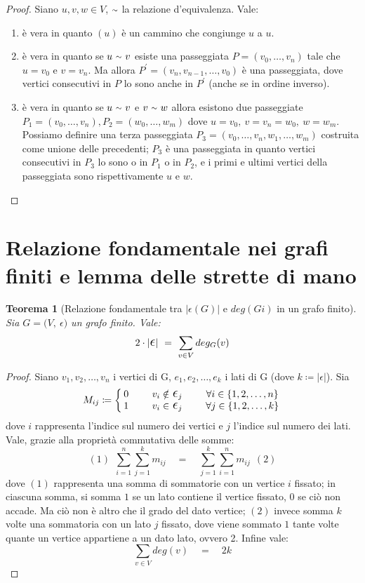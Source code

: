 \documentclass[12pt,twoside]{article}
\newcommand{\pr}{\prime}
\newcommand{\Eps}{${\Large$\epsilon$}$}
\newcommand{\grafo}{(V, \: \Eps)}
\newcommand{\til}{\raise.17ex\hbox{$\scriptstyle\mathtt{\sim}$}}
\newtheorem{theorem}{Teorema}
\begin{document}
\begin{proof}
Siano $u, v, w \in V$, $\til$ la relazione d'equivalenza. Vale:
\begin{enumerate}
\item è vera in quanto $(u)$ è un cammino che congiunge $u$ a $u$.
\item è vera in quanto se $u\ \til\ v$ esiste una passeggiata $P = (v_0,\ldots, v_n)$ tale che $u = v_0$ e $v = v_n$. Ma allora $P^{\pr} = (v_n, v_{n-1},\ldots ,v_0)$ è una passeggiata, dove vertici consecutivi in $P$ lo sono anche in $P^{\pr}$ (anche se in ordine inverso).
\item è vera in quanto se $u\ \til\ v$ e $v\ \til\ w$ allora esistono due passeggiate $P_1 = (v_0,\ldots ,v_n), P_2 = (w_0,\ldots, w_m)$ dove $u = v_0,\ v = v_n = w_0,\ w = w_m$. Possiamo definire una terza passeggiata $P_3 = (v_0,\ldots ,v_n,w_1,\ldots ,w_m)$ costruita come unione delle precedenti; $P_3$ è una passeggiata in quanto vertici consecutivi in $P_3$ lo sono o in $P_1$ o in $P_2$, e i primi e ultimi vertici della passeggiata sono rispettivamente $u$ e $w$.
\end{enumerate}
\end{proof}

\section{Relazione fondamentale nei grafi finiti e lemma delle strette di mano}
\begin{theorem}[Relazione fondamentale tra $|\Eps(G)|$ e $deg(Gi)$ in un grafo finito]
Sia $G = \grafo$ un grafo finito. Vale:
$$ 2 \cdot | \mathlarger{\mathlarger{\epsilon}} | \ = \ \sum_{v\in V} deg_G (v) $$
\end{theorem}

\begin{proof}
Siano $v_1, v_2,\ldots ,v_n$ i vertici di G, $e_1, e_2,\ldots, e_k$ i lati di G (dove $k \coloneqq | \Eps |$). Sia
\[
M_{ij} \coloneqq \left\{
\setlength\arraycolsep{2pt}
\begin{array}{ccc} 0 &\qquad v_i \notin \ \Eps_j &\qquad \forall i \in \{1, 2, \ldots , n\} \\ \relax
1 &\qquad v_i \in \ \Eps_j &\qquad \forall j \in \{1, 2, \ldots ,k \} 
\end{array}\right
.
\]
dove $i$ rappresenta l'indice sul numero dei vertici e $j$ l'indice sul numero dei lati. Vale, grazie alla proprietà commutativa delle somme:
$$ (1)\ \ \sum_{i=1}^n \sum_{j=1}^k m_{ij} \quad = \quad \sum_{j=1}^k\sum_{i=1}^n m_{ij}\ \ (2)$$
dove $(1)$ rappresenta una somma di sommatorie con un vertice $i$ fissato; in ciascuna somma, si somma $1$ se un lato contiene il vertice fissato, $0$ se ciò non accade. Ma ciò non è altro che il grado del dato vertice; $(2)$ invece somma $k$ volte una sommatoria con un lato $j$ fissato, dove viene sommato $1$ tante volte quante un vertice appartiene a un dato lato, ovvero 2. Infine vale:
$$ \sum_{v\in V} deg(v) \quad = \quad 2k$$
\end{proof}
\end{document}
